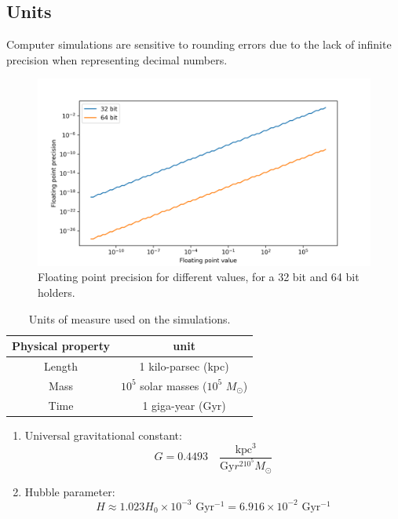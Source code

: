 \documentclass{beamer}
\newcommand{\sm}[0]{$M_\odot$}
\begin{document}
\subsection{Units}
\begin{frame}
	Computer simulations are sensitive to rounding errors due to the lack of infinite precision when representing decimal numbers.
	\begin{figure}[h]
		\centering
		\includegraphics[width=0.7\linewidth]{"../Files/Week 3/floating"}
		\caption{Floating point precision for different values, for a 32 bit and 64 bit holders.}
		\label{fig: IEEE-754}
	\end{figure}
\end{frame}

\begin{frame}{}
	\begin{table}[h]
		\centering
		\caption{Units of measure used on the simulations.}
		\label{tb: units}
		\begin{tabular}{c|c}
			\hline
			\textbf{Physical property} & \textbf{unit} \\
			\hline
			Length & 1 kilo-parsec (kpc) \\
			Mass & $10^5$ solar masses ($10^5$ \sm) \\
			Time & 1 giga-year (Gyr) \\
			\hline
		\end{tabular}
	\end{table}
	\begin{enumerate}
		\item Universal gravitational constant:
		\begin{equation}
			G = 0.4493 \quad \dfrac{\text{kpc$^3$}}{\text{Gy$r^210^5$\sm}}
		\end{equation}
		\item Hubble parameter:
			\begin{equation}
			H \approx 1.023 H_0 \times10^{-3} \text{ Gyr$^{-1}$} = 6.916\times10^{-2}\text{ Gyr$^{-1}$}
			\end{equation}
	\end{enumerate}
\end{frame}
\end{document}
